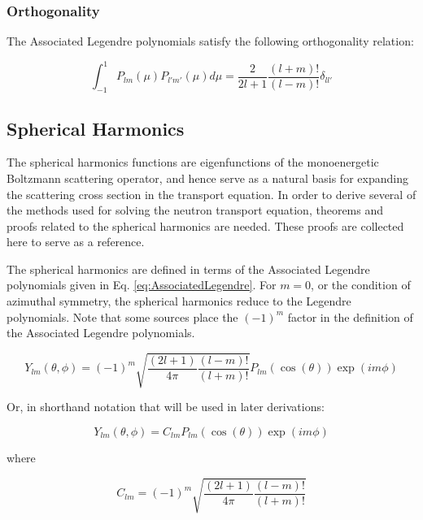 \documentclass[10pt]{article}
\begin{document}
\begin{flushleft}
\subsubsection{Orthogonality}

The Associated Legendre polynomials satisfy the following orthogonality relation:

\begin{equation}
\label{eq:AssociatedLegendreOthogonality}
\int_{-1}^{1}P_{lm}(\mu)P_{l'm'}(\mu)d\mu=\frac{2}{2l+1}\frac{(l+m)!}{(l-m)!}\delta_{ll'}
\end{equation}





\subsection{Spherical Harmonics}

The spherical harmonics functions are eigenfunctions of the monoenergetic Boltzmann scattering operator, and hence serve as a natural basis for expanding the scattering cross section in the transport equation. In order to derive several of the methods used for solving the neutron transport equation, theorems and proofs related to the spherical harmonics are needed. These proofs are collected here to serve as a reference.

The spherical harmonics are defined in terms of the Associated Legendre polynomials given in Eq. \eqref{eq:AssociatedLegendre}. For \(m=0\), or the condition of azimuthal symmetry, the spherical harmonics reduce to the Legendre polynomials. Note that some sources place the \((-1)^m\) factor in the definition of the Associated Legendre polynomials. 

\begin{equation}
\label{eq:SphericaltoAssociated}
Y_{lm}(\theta,\phi)=(-1)^m\sqrt{\frac{(2l+1)}{4\pi}\frac{(l-m)!}{(l+m)!}}P_{lm}(\cos{(\theta)})\exp{(im\phi)}
\end{equation}

Or, in shorthand notation that will be used in later derivations:

\begin{equation}
\label{eq:SphericaltoAssociatedShort}
Y_{lm}(\theta,\phi)=C_{lm}P_{lm}(\cos{(\theta)})\exp{(im\phi)}
\end{equation}

where

\begin{equation}
\label{eq:Clm}
C_{lm}=(-1)^m\sqrt{\frac{(2l+1)}{4\pi}\frac{(l-m)!}{(l+m)!}}
\end{equation}




\end{flushleft}
\end{document}
